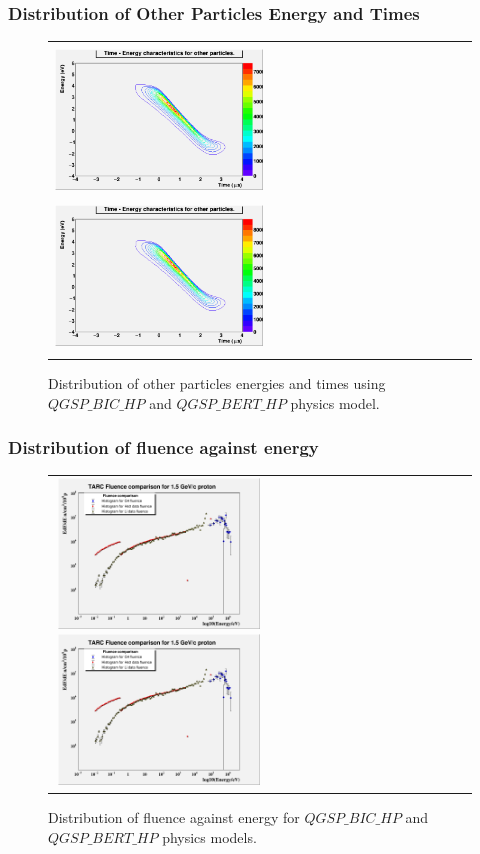 \documentclass{beamer}
\begin{document}
    \begin{frame}
        \frametitle{Distribution of Other Particles Energy and Times}
        \begin{figure}
            \begin{tabular}{ll}
                \includegraphics[height=40mm, width=55mm]{../PICS/OtherEnergyTimeCONTBIC.png}
                \label{fig:othETCONTBIC}
                \includegraphics[height=40mm, width=55mm]{../PICS/OtherEnergyTimeCONTBERT.png}
                \label{fig:othETContBERT}
            \end{tabular}
            \caption{Distribution of other particles energies and times using $QGSP\_BIC\_HP$ and $QGSP\_BERT\_HP$ physics model.}
        \end{figure}
    \end{frame}

    \begin{frame}
        \frametitle{Distribution of fluence against energy}
        \begin{figure}
            \begin{tabular}{ll}
                \includegraphics[height=40mm, width=55mm]{../PICS/fluenceBIC.png}\label{fig:flBIC}
                \includegraphics[height=40mm, width=55mm]{../PICS/fluenceBERT.png}\label{fig:flBERT}
            \end{tabular}    
        \caption{Distribution of fluence against energy for $QGSP\_BIC\_HP$ and $QGSP\_BERT\_HP$ physics models.}
        \end{figure}
    \end{frame}
\end{document}
